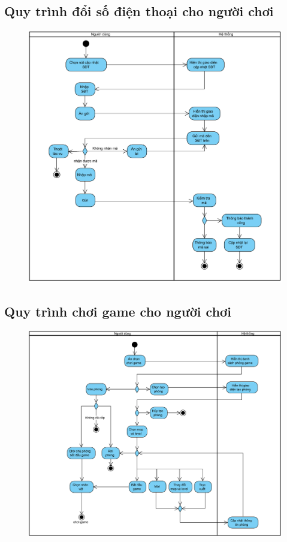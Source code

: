 \documentclass[3p]{elsarticle}
\begin{document}
\subsection{Quy trình đổi số điện thoại cho người chơi}
\begin{figure}[!htbp]
	\centering
	\includegraphics[scale=.6]{images/activities/ChangePhoneNumber.pdf}
\end{figure}
%
\newpage
\subsection{Quy trình chơi game cho người chơi}
\begin{figure}[!htbp]
	\centering
	\includegraphics[scale=.5]{images/activities/Playgame.pdf}
\end{figure}
%
%
%
\newpage
\end{document}
